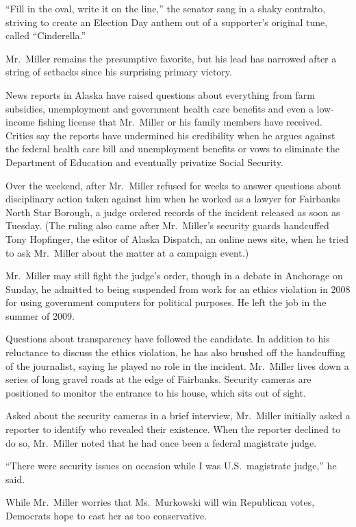﻿\documentclass[12pt]{article}
\begin{document}
``Fill in the oval, write it on the line,'' the senator sang in a shaky contralto, striving to
create an Election Day anthem out of a supporter's original tune, called ``Cinderella.''

Mr.~Miller remains the presumptive favorite, but his lead has narrowed after a string of setbacks
since his surprising primary victory.

News reports in Alaska have raised questions about everything from farm subsidies, unemployment and
government health care benefits and even a low-income fishing license that Mr.~Miller or his family
members have received. Critics say the reports have undermined his credibility when he argues
against the federal health care bill and unemployment benefits or vows to eliminate the Department
of Education and eventually privatize Social Security.

Over the weekend, after Mr.~Miller refused for weeks to answer questions about disciplinary action
taken against him when he worked as a lawyer for Fairbanks North Star Borough, a judge ordered
records of the incident released as soon as Tuesday. (The ruling also came after Mr.~Miller's
security guards handcuffed Tony Hopfinger, the editor of Alaska Dispatch, an online news site, when
he tried to ask Mr.~Miller about the matter at a campaign event.)

Mr.~Miller may still fight the judge's order, though in a debate in Anchorage on Sunday, he admitted
to being suspended from work for an ethics violation in 2008 for using government computers for
political purposes. He left the job in the summer of 2009.

Questions about transparency have followed the candidate. In addition to his reluctance to discuss
the ethics violation, he has also brushed off the handcuffing of the journalist, saying he played no
role in the incident. Mr.~Miller lives down a series of long gravel roads at the edge of Fairbanks.
Security cameras are positioned to monitor the entrance to his house, which sits out of sight.

Asked about the security cameras in a brief interview, Mr.~Miller initially asked a reporter to
identify who revealed their existence. When the reporter declined to do so, Mr.~Miller noted that he
had once been a federal magistrate judge.

``There were security issues on occasion while I was U.S.~magistrate judge,'' he said.

While Mr.~Miller worries that Ms.~Murkowski will win Republican votes, Democrats hope to cast her as
too conservative.
\end{document}
